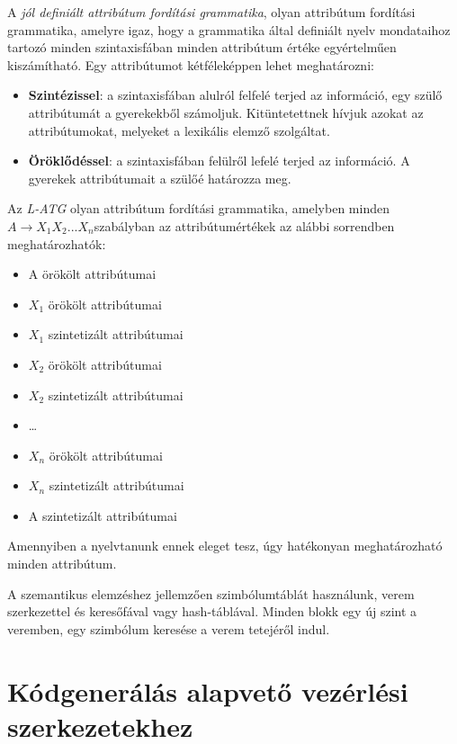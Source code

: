 \documentclass[12pt,margin=0px]{article}
\begin{document}
	\noindent A \emph{jól definiált attribútum fordítási grammatika}, olyan attribútum fordítási grammatika, amelyre igaz, hogy a	grammatika által definiált nyelv mondataihoz tartozó minden szintaxisfában minden attribútum értéke egyértelműen kiszámítható.
\newpage	
	\noindent Egy attribútumot kétféleképpen lehet meghatározni:
    \begin{itemize}	
	   \item\noindent \textbf{Szintézissel}: a szintaxisfában alulról felfelé terjed az információ, egy szülő attribútumát a gyerekekből számoljuk. Kitüntetettnek hívjuk azokat az attribútumokat, melyeket a lexikális elemző szolgáltat.
	   \item \textbf{Öröklődéssel}: a szintaxisfában felülről lefelé terjed az információ. A gyerekek attribútumait a szülőé határozza meg.
	\end{itemize}
	\noindent Az \emph{L-ATG} olyan attribútum fordítási grammatika, amelyben minden
	$ A	\rightarrow	X_1X_2 . . .	X_n  $szabályban az attribútumértékek az alábbi sorrendben meghatározhatók:
	
	\begin{itemize}
		\item
		A örökölt attribútumai
		\item
		$ X_1 $ örökölt attribútumai
		\item
		$ X_1 $ szintetizált attribútumai
		\item
		$ X_2 $ örökölt attribútumai
		\item
		$ X_2 $ szintetizált attribútumai
		\item
		\dots
		\item
		$ X_n $ örökölt attribútumai
		\item
		$ X_n $ szintetizált attribútumai
		\item
		A szintetizált attribútumai
	\end{itemize}

	\noindent Amennyiben a nyelvtanunk ennek eleget tesz, úgy hatékonyan meghatározható minden attribútum.

    \noindent A szemantikus elemzéshez jellemzően szimbólumtáblát használunk, verem szerkezettel és keresőfával vagy hash-táblával. Minden blokk egy új szint a veremben, egy szimbólum keresése a verem tetejéről indul.
	
    \section*{Kódgenerálás alapvető vezérlési szerkezetekhez}
\end{document}
